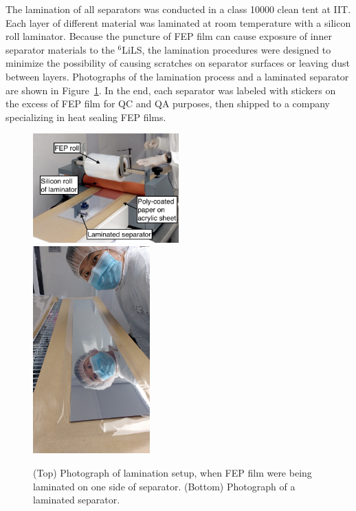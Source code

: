 The lamination of all separators was conducted in a class 10000 clean tent at IIT.
Each layer of different material was laminated at room temperature with a silicon roll laminator.
Because the puncture of FEP film can cause exposure of inner separator materials to the $^6$LiLS, the lamination procedures were designed to minimize the possibility of causing scratches on separator surfaces or leaving dust between layers.
Photographs of the lamination process and a laminated separator are shown in Figure~\ref{fig:laminationPic}.
In the end, each separator was labeled with stickers on the excess of FEP film for QC and QA purposes, then shipped to a company specializing in heat sealing FEP films.

\begin{figure}[h!]
\centering
\includegraphics[width=0.5\textwidth]{Figures/Lamination.jpg} \\
\includegraphics[trim = 0.0cm 2.0cm 0.0cm 8.0cm, clip=true, width=0.4\textwidth]{figures/Separator.jpg}
\caption[Separator lamination]{(Top) Photograph of lamination setup, when FEP film were being laminated on one side of separator.
(Bottom) Photograph of a laminated separator.}
\label{fig:laminationPic}
\end{figure}

